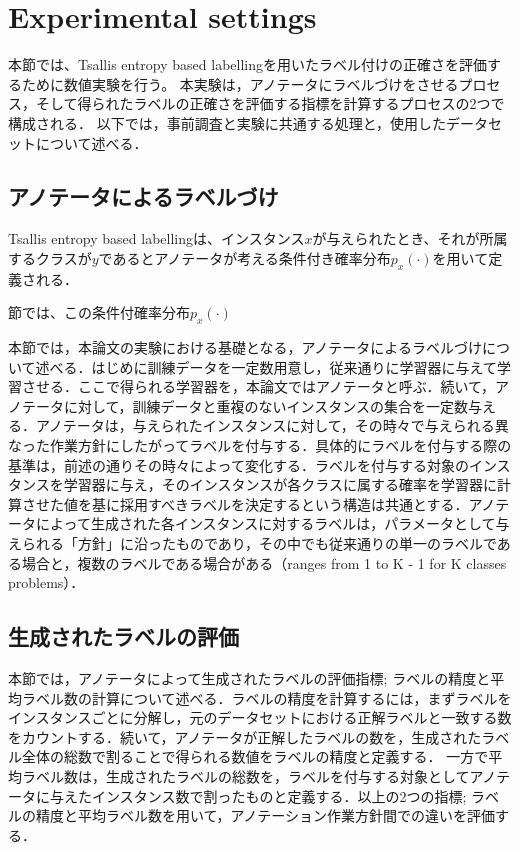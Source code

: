 \documentclass[a4paper,conference]{IEEEtran}
\begin{document}
\section{Experimental settings}\label{sec:experimental_settings}
本節では、Tsallis entropy based labellingを用いたラベル付けの正確さを評価するために数値実験を行う。
本実験は，アノテータにラベルづけをさせるプロセス，そして得られたラベルの正確さを評価する指標を計算するプロセスの2つで構成される．
以下では，事前調査と実験に共通する処理と，使用したデータセットについて述べる．

\subsection{アノテータによるラベルづけ}\label{subsec:annotation_process}
Tsallis entropy based labellingは、インスタンス$x$が与えられたとき、それが所属するクラスが$y$であるとアノテータが考える条件付き確率分布$p_{x}(\cdot)$を用いて定義される．

節では、この条件付確率分布$p_{x}(\cdot)$



本節では，本論文の実験における基礎となる，アノテータによるラベルづけについて述べる．はじめに訓練データを一定数用意し，従来通りに学習器に与えて学習させる．ここで得られる学習器を，本論文ではアノテータと呼ぶ．続いて，アノテータに対して，訓練データと重複のないインスタンスの集合を一定数与える．アノテータは，与えられたインスタンスに対して，その時々で与えられる異なった作業方針にしたがってラベルを付与する．具体的にラベルを付与する際の基準は，前述の通りその時々によって変化する．ラベルを付与する対象のインスタンスを学習器に与え，そのインスタンスが各クラスに属する確率を学習器に計算させた値を基に採用すべきラベルを決定するという構造は共通とする．アノテータによって生成された各インスタンスに対するラベルは，パラメータとして与えられる「方針」に沿ったものであり，その中でも従来通りの単一のラベルである場合と，複数のラベルである場合がある（ranges from 1 to K - 1 for K classes problems）．

\subsection{生成されたラベルの評価}\label{subsec:labels_evaluation}
本節では，アノテータによって生成されたラベルの評価指標; ラベルの精度と平均ラベル数の計算について述べる．ラベルの精度を計算するには，まずラベルをインスタンスごとに分解し，元のデータセットにおける正解ラベルと一致する数をカウントする．続いて，アノテータが正解したラベルの数を，生成されたラベル全体の総数で割ることで得られる数値をラベルの精度と定義する．
一方で平均ラベル数は，生成されたラベルの総数を，ラベルを付与する対象としてアノテータに与えたインスタンス数で割ったものと定義する．以上の2つの指標; ラベルの精度と平均ラベル数を用いて，アノテーション作業方針間での違いを評価する．
\end{document}
